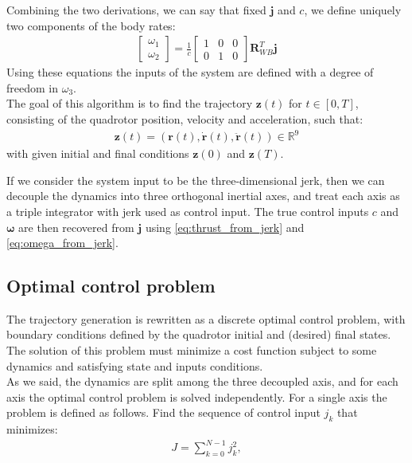 Combining the two derivations, we can say that fixed $\boldsymbol{j}$ and $c$, we define uniquely two components of the body rates:
\begin{align}
{\begin{bmatrix}
\omega_1 \\[10pt]
\omega_2
\end{bmatrix}}  = \frac{1}{c}
{\begin{bmatrix}
1 & 0 & 0  \\[10pt]
0 & 1 & 0
\end{bmatrix}}\boldsymbol{R}_{WB}^T \boldsymbol{j}
\label{eq:omega_from_jerk}
\end{align}
Using these equations the inputs of the system are defined with a degree of freedom in $\omega_3$.\\

The goal of this algorithm is to find  the trajectory $\boldsymbol{z}(t)$ for $t \in [0,T]$, consisting of the quadrotor position, velocity and acceleration, such that:
\begin{align}
\boldsymbol{z}(t) = (\boldsymbol{r}(t),\dot{\boldsymbol{r}}(t),\ddot{\boldsymbol{r}}(t)) \in \mathbb{R}^9
\end{align}
with given initial and final conditions $\boldsymbol{z}(0)$ and $\boldsymbol{z}(T)$.

If we consider the system input to be the three-dimensional jerk, then we can decouple the dynamics into three orthogonal inertial axes, and treat each axis as a triple integrator with jerk used as control input. The true control inputs $c$ and $\boldsymbol{\omega}$ are then recovered from $\boldsymbol{j}$  using \eqref{eq:thrust_from_jerk} and \eqref{eq:omega_from_jerk}.


\subsection{Optimal control problem}
The trajectory generation is rewritten as a discrete optimal control problem, with boundary conditions defined by the quadrotor initial and (desired) final states. The solution of this problem must minimize a cost function subject to some dynamics and satisfying state and inputs conditions.\\

As we said, the dynamics are split among the three decoupled axis, and for each axis the optimal control problem is  solved independently. For a single axis the problem is defined as follows. Find the sequence of control input $j_k$ that minimizes:
\begin{align}
J = \sum_{k=0}^{N-1} j_k^2,
\end{align}

